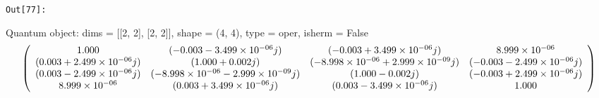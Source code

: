 \documentclass[11pt]{article}
\begin{document}
\texttt{\color{outcolor}Out[{\color{outcolor}77}]:}
    
    Quantum object: dims = [[2, 2], [2, 2]], shape = (4, 4), type = oper, isherm = False\begin{equation*}\left(\begin{array}{*{11}c}1.000 & (-0.003-3.499\times10^{-06}j) & (-0.003+3.499\times10^{-06}j) & 8.999\times10^{-06}\\(0.003+2.499\times10^{-06}j) & (1.000+0.002j) & (-8.998\times10^{-06}+2.999\times10^{-09}j) & (-0.003-2.499\times10^{-06}j)\\(0.003-2.499\times10^{-06}j) & (-8.998\times10^{-06}-2.999\times10^{-09}j) & (1.000-0.002j) & (-0.003+2.499\times10^{-06}j)\\8.999\times10^{-06} & (0.003+3.499\times10^{-06}j) & (0.003-3.499\times10^{-06}j) & 1.000\\\end{array}\right)\end{equation*}

    
\end{document}
